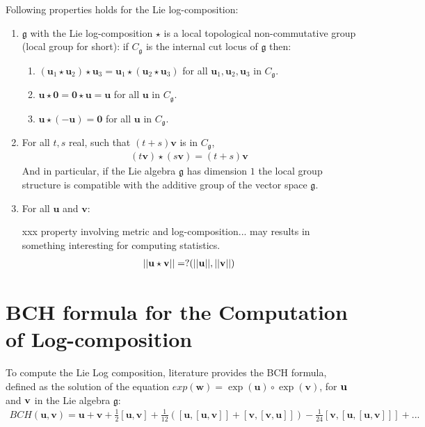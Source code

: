 \noindent
Following properties holds for the Lie log-composition:
\begin{enumerate}
\item $\mathfrak{g} $ with the Lie log-composition $\star$ is a local topological non-commutative group (local group for short): if $C_{\mathfrak{g}}$ is the internal cut locus of $\mathfrak{g}$ then:
\begin{enumerate}
	\item $(\mathbf{u}_{1}\star\mathbf{u}_{2}) \star \mathbf{u}_{3}
	= \mathbf{u}_{1}\star(\mathbf{u}_{2} \star \mathbf{u}_{3})$ for all $\mathbf{u}_{1}, \mathbf{u}_{2}, \mathbf{u}_{3}$ in $C_{\mathfrak{g}}$.
	\item $\mathbf{u}\star\mathbf{0}  = \mathbf{0}\star\mathbf{u} = \mathbf{u}$ for all $\mathbf{u}$ in $C_{\mathfrak{g}}$.
	\item $\mathbf{u}\star(-\mathbf{u} ) = \mathbf{0}$ for all $\mathbf{u}$ in $C_{\mathfrak{g}}$.
\end{enumerate}
\item For all $t,s$ real, such that $(t+s)\mathbf{v}$ is in $C_{\mathfrak{g}}$,
\begin{align*}
(t\mathbf{v})\star (s\mathbf{v}) = (t+s)\mathbf{v}
\end{align*}
And in particular, if the Lie algebra $\mathfrak{g}$ has dimension $1$ the local group structure is compatible with the additive group of the vector space $\mathfrak{g}$.
\item For all $\mathbf{u}$ and $\mathbf{v}$: 

\noindent
xxx property involving metric and log-composition... may results in something interesting for computing statistics.
\begin{align*}
\vert\lvert \mathbf{u}\star \mathbf{v} \rvert\vert = ?( \vert\lvert \mathbf{u} \rvert\vert , \vert\lvert \mathbf{v} \rvert\vert)
\end{align*}
\end{enumerate}

\section{BCH formula for the Computation of Log-composition}\label{se:bch_formula}

To compute the Lie Log composition, literature provides the BCH formula, defined as the solution of the equation $exp(\mathbf{w}) = \exp(\mathbf{u}) \circ \exp(\mathbf{v})$, for $\bf{u}$ and $\bf{v}$ in the Lie algebra $\mathfrak{g}$:
\begin{align*}
BCH(\mathbf{u},\mathbf{v}) 
= 
\mathbf{u} + \mathbf{v} + \frac{1}{2}[\mathbf{u},\mathbf{v}] + \frac{1}{12}([\mathbf{u},[\mathbf{u},\mathbf{v}]]
+ [\mathbf{v},[\mathbf{v},\mathbf{u}]]) - \frac{1}{24}[\mathbf{v},[\mathbf{u},[\mathbf{u},\mathbf{v}]]] +... 
\end{align*}

